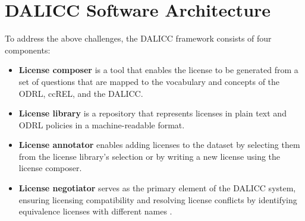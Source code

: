 \section{DALICC Software Architecture}

To address the above challenges, the DALICC framework consists of four components:\\
\begin{itemize}
	\item \textbf{License composer} is a tool that enables the license to be generated from a set of questions that are mapped to the vocabulary and concepts of the ODRL, ccREL, and the DALICC.
	\item \textbf{License library} is a repository that represents licenses in plain text and ODRL policies in a machine-readable format.
	\item \textbf{License annotator}  enables adding licenses to the dataset by selecting them from the license library's selection or by writing a new license using the license composer.
	\item \textbf{License negotiator} serves as the primary element of the DALICC system, ensuring licensing compatibility and resolving license conflicts by identifying equivalence licenses with different names \cite{Anna}.
\end{itemize}
